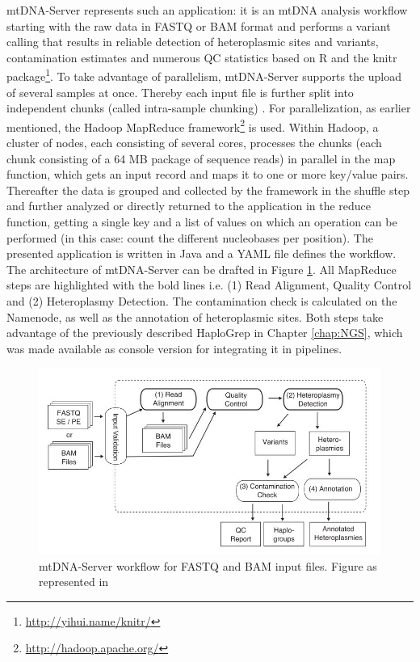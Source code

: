 mtDNA-Server represents such an application: it is an mtDNA analysis workflow starting with the raw data in FASTQ or BAM format and performs a variant calling that results in reliable detection of heteroplasmic sites and variants, contamination estimates and numerous QC statistics based on R \cite{R} and the knitr package\footnote{\url{http://yihui.name/knitr/}}. To take advantage of parallelism, mtDNA-Server supports the upload of several samples at once. Thereby each input file is further split into independent chunks (called intra-sample chunking) \cite{Weissensteiner2016b}. For parallelization, as earlier mentioned, the Hadoop MapReduce framework\footnote{\url{http://hadoop.apache.org/}} is used. Within Hadoop, a cluster of nodes, each consisting of several cores, processes the chunks (each chunk consisting of a 64 MB package of sequence reads) in parallel in the map function, which gets an input record and maps it to one or more key/value pairs. Thereafter the data is grouped and collected by the framework in the shuffle step and further analyzed or directly returned to the application in the reduce function, getting a single key and a list of values on which an operation can be performed (in this case: count the different nucleobases per position). The presented application is written in Java and a YAML file defines the workflow. The architecture of mtDNA-Server can be drafted in Figure \ref{fig:mtdna-server-architecture}. All MapReduce steps are highlighted with the bold lines i.e. (1) Read Alignment, Quality Control and (2) Heteroplasmy Detection. The contamination check is calculated on the Namenode, as well as the annotation of heteroplasmic sites. Both steps take advantage of the previously described HaploGrep in Chapter \ref{chap:NGS}, which was made available as console version for integrating it in pipelines. 
\begin{figure}[h]
    \centering
    \includegraphics[width=1\textwidth]{images/mtdna-server.JPG}
    \caption[mtDNA-Server workflow for FASTQ and BAM input files]{mtDNA-Server workflow for FASTQ and BAM input files. Figure as represented in \cite{Weissensteiner2016b}}
    \label{fig:mtdna-server-architecture}
\end{figure}
